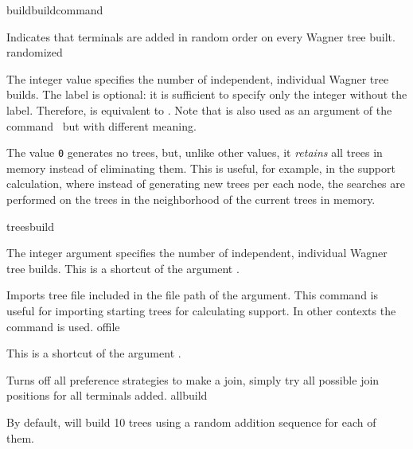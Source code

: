 \begin{command}{build}{buildcommand}
\begin{arguments}
            {Indicates that terminals are added in random order on every Wagner
            tree built.}
            {randomized}

            {The integer value specifies the number of independent, individual
            Wagner tree builds. The label  is optional: it is
            sufficient to specify only the integer without the
             label. Therefore,  is
            equivalent to .  Note that   is
            also used as an argument of the command~
            but with different meaning.
            
            The value \texttt{0} generates no trees, but, unlike other values,
            it \emph{retains} all trees in memory instead of eliminating them.
            This is useful, for example, in the  support calculation,
            where instead of generating new trees per each node, the searches are
            performed on the trees in the neighborhood of the current trees in memory.}
            {treesbuild}
            
            {The integer argument specifies the number of independent, individual
            Wagner tree builds. This is a shortcut of the argument .}
            {}

            {Imports tree file included in the file path of the argument. This command is
            useful for importing starting trees for calculating  support.
            In other contexts the command  is used.}
            {offile}

            {This is a shortcut of the argument .}
            {}

            {Turns off all preference strategies to make a join, simply try all possible join positions for all terminals added.}
            {allbuild}
        
   \end{arguments}
      
       {By default, \poy will build 10 trees using a random addition sequence for
       each of them.}


\end{command}

